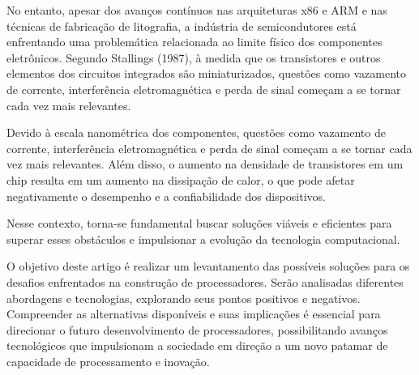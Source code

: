 No entanto, apesar dos avanços contínuos nas arquiteturas x86 e ARM e nas técnicas de fabricação de litografia, a indústria de semicondutores está enfrentando uma problemática relacionada ao limite físico dos componentes eletrônicos. Segundo Stallings (1987), à medida que os transistores e outros elementos dos circuitos integrados são miniaturizados, questões como vazamento de corrente, interferência eletromagnética e perda de sinal começam a se tornar cada vez mais relevantes.

Devido à escala nanométrica dos componentes, questões como vazamento de corrente, interferência eletromagnética e perda de sinal começam a se tornar cada vez mais relevantes. Além disso, o aumento na densidade de transistores em um chip resulta em um aumento na dissipação de calor, o que pode afetar negativamente o desempenho e a confiabilidade dos dispositivos.

Nesse contexto, torna-se fundamental buscar soluções viáveis e eficientes para superar esses obstáculos e impulsionar a evolução da tecnologia computacional.

O objetivo deste artigo é realizar um levantamento das possíveis soluções para os desafios enfrentados na construção de processadores. Serão analisadas diferentes abordagens e tecnologias, explorando seus pontos positivos e negativos. Compreender as alternativas disponíveis e suas implicações é essencial para direcionar o futuro desenvolvimento de processadores, possibilitando avanços tecnológicos que impulsionam a sociedade em direção a um novo patamar de capacidade de processamento e inovação.
